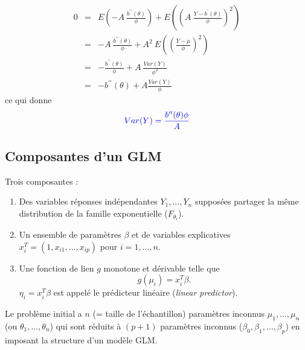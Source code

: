 \documentclass{BeamerTemplate}
\begin{document}
\begin{refsection}
\begin{frame}{}
\begin{eqnarray*}
0 & = & E\left(- A \ \frac{b^{\prime \prime}(\theta)}{\phi}\right) +   E\left(
\left( A \ \frac{Y - b^{\prime}(\theta)}{\phi}\right)^2\right)\\
 & = &  - A \ \frac{b^{\prime \prime}(\theta)}{\phi} + A^2  \ E\left(
\left( \frac{Y - \mu}{\phi}\right)^2\right)\\
 & = & - \frac{b^{\prime \prime}(\theta)}{\phi} + A \ \frac{Var(Y)}{\phi^2}\\
 & = & - b^{\prime \prime}(\theta) + A \frac{Var(Y)}{\phi}
\end{eqnarray*}
\bigskip
ce qui donne
\begin{equation}
\label{var.exponential}
{\color{blue}Var(Y) = \frac{b^{\prime \prime}(\theta)\phi}{ A}}
\end{equation}
\end{frame}

\subsection{Composantes d'un GLM}

\begin{frame}{}

{\color{blue}Trois composantes} :

\begin{enumerate}
\item Des variables réponses indépendantes $Y_1, \ldots,Y_n$ supposées partager
  la même distribution de la famille exponentielle ($F_{\theta_i}$).
\item Un ensemble de paramètres $\beta$ et de variables explicatives $x_i^T = (1,
x_{i1},  \ldots, x_{ip})$ pour $i=1,\ldots,n$.
\item Une fonction de lien $g$ monotone et dérivable telle que
$$g(\mu_i) = x_i^T  \beta.$$
$\eta_i = x_i^T \beta$ est appelé le prédicteur linéaire (\textit{linear predictor}).
\end{enumerate}

\end{frame}

\begin{frame}{}

Le problème initial a $n$ (= taille de l'échantillon) paramètres inconnus $\mu_1,
\ldots,\mu_n$ (ou $\theta_1, \ldots, \theta_n$) qui sont réduits à $(p+1)$
paramètres inconnus ($\beta_0, \beta_1,\ldots,\beta_p$) en imposant la structure
d'un modèle GLM.

\bigskip
\bigskip


\end{frame}
\end{refsection}
\end{document}

